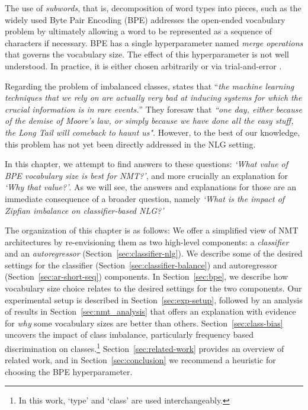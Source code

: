 The use of \textit{subwords}, that is, decomposition of word types into pieces, such as the widely used Byte Pair Encoding (BPE) \cite{sennrich-etal-2016-bpe} addresses the open-ended vocabulary problem by ultimately allowing a word to be represented as a sequence of characters if necessary.
BPE has a single hyperparameter named \textit{merge operations} that governs the vocabulary size. 
The effect of this hyperparameter is not well understood. 
In practice, it is either chosen arbitrarily or via trial-and-error \cite{DBLP:journals/corr/abs-1810-08641}.

Regarding the problem of imbalanced classes, \citet{steedman-2008-last} states that ``\textit{the machine learning techniques that we rely on are actually very bad at inducing systems for which the crucial information is in rare events.}'' 
They foresaw that \textit{``one day, either because of the demise of Moore’s law, or simply because we have done all the easy stuff, the Long Tail will comeback to haunt us"}.
However, to the best of our knowledge, this problem has not yet been directly addressed in the NLG setting.

In this chapter, we attempt to find answers to these questions: \textit{`What value of BPE vocabulary size is best for NMT?'}, and more crucially an explanation for \textit{`Why that value?'}.
As we will see, the answers and explanations for those are an immediate consequence of a broader question, namely \textit{`What is the impact of Zipfian imbalance on classifier-based NLG?'}

The organization of this chapter is as follows:
We offer a simplified view of NMT architectures by re-envisioning them as two high-level components: a \textit{classifier} and an \textit{autoregressor} (Section~\ref{sec:classifier-nlg}).
We describe some of the desired settings for the classifier (Section~\ref{sec:classifier-balance}) and autoregressor (Section~\ref{sec:ar-short-seq}) components.
In Section~\ref{sec:bpe}, we describe how vocabulary size choice relates to the desired settings for the two components. 
Our experimental setup is described in Section~\ref{sec:exp-setup}, followed by an analysis of results in Section~\ref{sec:nmt_analysis} that offers an explanation with evidence for \textit{why} some vocabulary sizes are better than others.  
Section~\ref{sec:class-bias} uncovers the impact of class imbalance, particularly frequency based discrimination on classes.\footnote{In this work, `type' and `class' are used interchangeably.}
Section~\ref{sec:related-work} provides an overview of  related work, and in Section~\ref{sec:conclusion} we recommend a heuristic for choosing the BPE hyperparameter.

